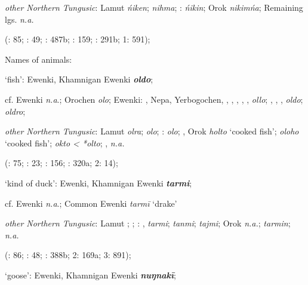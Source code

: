 \documentclass[output=paper,colorlinks,citecolor=brown]{langscibook}
\begin{document}
\begin{xlist}
\begin{xlist}
    \textit{other Northern Tungusic}: Lamut \textit{ńiken};  \textit{nihma}; \textit{}:  \textit{ńikin}; Orok \textit{nikimńa}; Remaining lgs. \textit{n.a.}

    (\citealt{Castrén1856}: 85; \citealt{Janhunen1991}: 49; \citealt{Dorji1998}: 487b; \citealt{Chaoke2014a}: 159; \citealt{Vasilevic1958}: 291b; \citealt{Cincius1975B} 1: 591);
\end{xlist}

    \ex Names of animals:

\begin{xlist}
    \ex ‘fish’:  Ewenki, Khamnigan Ewenki \textbf{\textit{oldo}};

    cf.  Ewenki \textit{n.a}.; Orochen \textit{olo};  Ewenki: , Nepa, Yerbogochen, , , , , ,  \textit{ollo}; , , ,  \textit{oldo};  \textit{oldro};

    \textit{other Northern Tungusic}: Lamut \textit{olra};  \textit{olo}; \textit{}:  \textit{olo}; , Orok \textit{holto} ‘cooked fish’;  \textit{oloho} ‘cooked fish’;  \textit{okto < *olto}; ,  \textit{n.a.} 
    
    (\citealt{Castrén1856}: 75; \citealt{Janhunen1991}: 23; \citealt{Chaoke2014a}: 156; \citealt{Vasilevic1958}: 320a; \citealt{Cincius1975B} 2: 14); 

    \ex ‘kind of duck’:  Ewenki, Khamnigan Ewenki \textbf{\textit{tarmi}};

    cf.  Ewenki \textit{n.a}.;  Common Ewenki \textit{tarmī} ‘drake’

    \textit{other Northern Tungusic}: Lamut ;  ; \textit{}: ,  \textit{tarmi};  \textit{tanmi};  \textit{tajmi}; Orok \textit{n.a.};  \textit{tarmin};  \textit{n.a.}
    
    (\citealt{Castrén1856}: 86; \citealt{Janhunen1991}: 48; \citealt{Vasilevic1958}: 388b; \citealt{Cincius1975B} 2: 169a; \citealt{Hauer1952} 3: 891);

    \ex ‘goose’:  Ewenki, Khamnigan Ewenki \textbf{\textit{nuŋnakī}};


\end{xlist}
\end{xlist}
\end{document}
